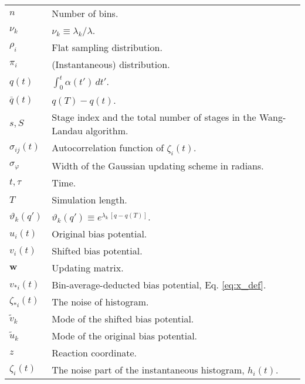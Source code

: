 \documentclass[reprint, superscriptaddress, floatfix]{revtex4-1}
\begin{document}
{\begin{table*}
\begin{tabular}{l | p{12cm} }
    $n$             &   Number of bins. \\
    $\nu_k$         &   $\nu_k \equiv \lambda_k / \lambda$. \\
    $\rho_i$        &   Flat sampling distribution. \\
    $\pi_i$         &   (Instantaneous) distribution. \\
    $q(t)$          &   $\int_0^t \alpha(t') \, dt'$.  \\
    $\bar q(t)$     &   $q(T) - q(t)$.  \\
    $s, S$          &   Stage index and the total number of stages in the Wang-Landau algorithm. \\
    $\sigma_{ij}(t)$   &   Autocorrelation function of $\zeta_i(t)$. \\
    $\sigma_\varphi$   &   Width of the Gaussian updating scheme in radians. \\
    $t, \tau$       &   Time. \\
    $T$             &   Simulation length. \\
    $\vartheta_k(q')$       &   $\vartheta_k(q') \equiv e^{\lambda_k \, [q - q(T)]}$. \\
    $u_i(t)$        &   Original bias potential. \\
    $v_i(t)$        &   Shifted bias potential. \\
    $\mathbf w$     &   Updating matrix. \\
    $v_{*i}(t)$        &   Bin-average-deducted bias potential, Eq. \eqref{eq:x_def}. \\
    $\zeta_{*i}(t)$      &   The noise of histogram. \\
    ${\tilde v}_k$        &   Mode of the shifted bias potential. \\
    ${\tilde u}_k$           &   Mode of the original bias potential. \\
    $z$             &   Reaction coordinate. \\
    $\zeta_i(t)$    &   The noise part of the instantaneous histogram, $h_i(t)$.
  \end{tabular}
  \end{table*}
}


\end{document}
